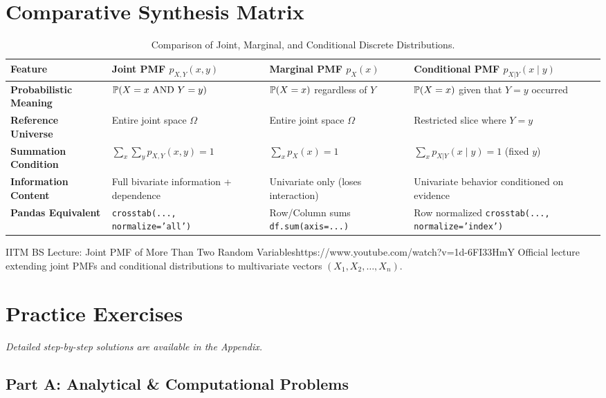 \section{Comparative Synthesis Matrix}

\begin{table}[htbp]
\centering
\small
\begin{tabular}{p{3.2cm}p{3.8cm}p{3.8cm}p{3.5cm}}
\toprule
\textbf{Feature} & \textbf{Joint PMF $p_{X,Y}(x, y)$} & \textbf{Marginal PMF $p_X(x)$} & \textbf{Conditional PMF $p_{X|Y}(x \mid y)$} \\
\midrule
\textbf{Probabilistic Meaning} & $\P(X=x \text{ AND } Y=y)$ & $\P(X=x)$ regardless of $Y$ & $\P(X=x)$ given that $Y=y$ occurred \\
\addlinespace
\textbf{Reference Universe} & Entire joint space $\Omega$ & Entire joint space $\Omega$ & Restricted slice where $Y=y$ \\
\addlinespace
\textbf{Summation Condition} & $\sum_x \sum_y p_{X,Y}(x,y) = 1$ & $\sum_x p_X(x) = 1$ & $\sum_x p_{X|Y}(x \mid y) = 1$ (fixed $y$) \\
\addlinespace
\textbf{Information Content} & Full bivariate information + dependence & Univariate only (loses interaction) & Univariate behavior conditioned on evidence \\
\addlinespace
\textbf{Pandas Equivalent} & \texttt{crosstab(..., normalize='all')} & Row/Column sums \texttt{df.sum(axis=...)} & Row normalized \texttt{crosstab(..., normalize='index')} \\
\bottomrule
\end{tabular}
\caption{Comparison of Joint, Marginal, and Conditional Discrete Distributions.}
\end{table}

\begin{videocard}{IITM BS Lecture: Joint PMF of More Than Two Random Variables}{https://www.youtube.com/watch?v=1d-6FI33HmY}
Official lecture extending joint PMFs and conditional distributions to multivariate vectors $(X_1, X_2, \dots, X_n)$.
\end{videocard}

\newpage
\section{Practice Exercises}
\textit{Detailed step-by-step solutions are available in the Appendix.}

\subsection*{Part A: Analytical \& Computational Problems}

